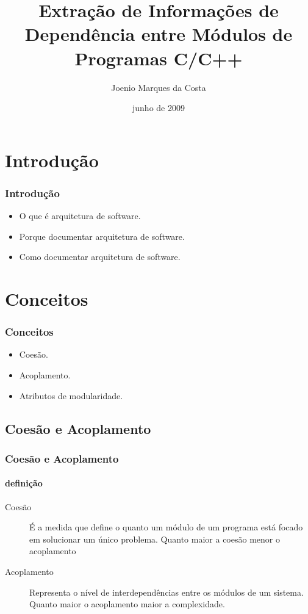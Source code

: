 \documentclass{beamer}
\title[Universidade Católica do Salvador]{Extração de Informações de Dependência entre Módulos de Programas C/C++}
\author[Joenio Costa]{Joenio Marques da Costa}
\institute{UCSal - Universidade Católica do Salvador}
\date{junho de 2009}
\begin{document}
\frame{\titlepage} %

\begin{frame}
 \tableofcontents
\end{frame}

\section{Introdução}

\begin{frame}
\frametitle{Introdução}
  \begin{itemize}
  \item<1-> O que é arquitetura de software.
  \item<1-> Porque documentar arquitetura de software.
  \item<1-> Como documentar arquitetura de software.
  \end{itemize}
\end{frame}

\section{Conceitos}

\begin{frame}
\frametitle{Conceitos}
  \begin{itemize}
  \item<1-> Coesão.
  \item<1-> Acoplamento.
  \item<1-> Atributos de modularidade.
  \end{itemize}
\end{frame}

\subsection{Coesão e Acoplamento}

\begin{frame}
\frametitle{Coesão e Acoplamento}
\framesubtitle{definição}
\begin{description}
\item[Coesão]É a medida que define o quanto um módulo de um programa está
focado em solucionar um único problema. Quanto maior a coesão menor o
acoplamento
\item[Acoplamento]Representa o nível de interdependências entre os módulos de
um sistema. Quanto maior o acoplamento maior a complexidade.
\end{description}
\end{frame}
\end{document}
